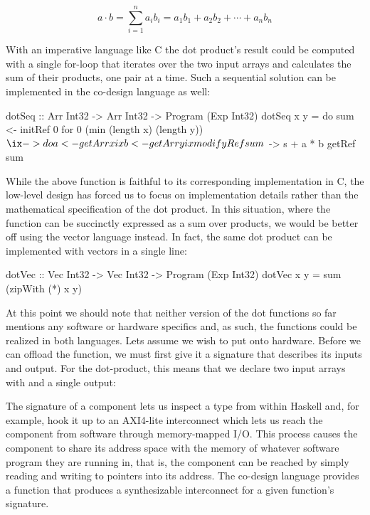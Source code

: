 \documentclass[../paper.tex]{subfiles}
\begin{document}
\begin{equation}
a \cdot b = \sum_{i=1}^{n}a_{i}b_{i} = a_{1}b_{1} + a_{2}b_{2} + \cdots + a_{n}b_{n}
\end{equation}

With an imperative language like C the dot product's result could be computed with a single for-loop that iterates over the two input arrays and calculates the sum of their products, one pair at a time. Such a sequential solution can be implemented in the co-design language as well:

\begin{code}
dotSeq :: Arr Int32 -> Arr Int32 -> Program (Exp Int32)
dotSeq x y = do
  sum <- initRef 0
  for 0 (min (length x) (length y)) $ \ix -> do
    a <- getArr x ix
    b <- getArr y ix
    modifyRef sum $ \s -> s + a * b
  getRef sum
\end{code}

While the above function is faithful to its corresponding implementation in C, the low-level design has forced us to focus on implementation details rather than the mathematical specification of the dot product. In this situation, where the function can be succinctly expressed as a sum over products, we would be better off using the vector language instead. In fact, the same dot product can be implemented with vectors in a single line:

\begin{code}
dotVec :: Vec Int32 -> Vec Int32 -> Program (Exp Int32)
dotVec x y = sum (zipWith (*) x y)
\end{code}

At this point we should note that neither version of the dot functions so far mentions any software or hardware specifics and, as such, the functions could be realized in both languages. Lets assume we wish to put  onto hardware. Before we can offload the function, we must first give it a signature that describes its inputs and output. For the dot-product, this means that we declare two input arrays with and a single output:


The signature of a component lets us inspect a type from within Haskell and, for example, hook it up to an AXI4-lite interconnect which lets us reach the component from software through memory-mapped I/O. This process causes the component to share its address space with the memory of whatever software program they are running in, that is, the component can be reached by simply reading and writing to pointers into its address. The co-design language provides a  function that produces a synthesizable interconnect for a given function's signature.
\end{document}
